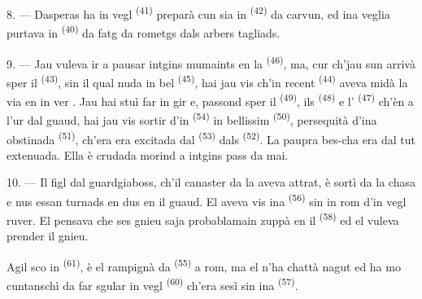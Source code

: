 8. --- Dasperas ha in vegl  \textsuperscript{(41)} preparà cun sia
 in  \textsuperscript{(42)} da carvun, ed ina veglia purtava
in  \textsuperscript{(40)} da  fatg da rometgs dals arbers
tagliads.

\VUsaut{3.0mm}
\VUsaut{3.0mm}

9. --- Jau vuleva ir a pausar intgins mumaints en la 
\textsuperscript{(46)}, ma, cur ch'jau sun arrivà sper il 
\textsuperscript{(43)}, sin il qual nuda in bel  \textsuperscript{(45)},
hai jau vis ch'in recent  \textsuperscript{(44)} aveva midà la via en in ver
. Jau hai stuì far in gir e, passond sper il 
\textsuperscript{(49)}, ils  \textsuperscript{(48)} e l'
\textsuperscript{(47)} ch'èn a l'ur dal guaud, hai jau vis sortir d'in 
\textsuperscript{(54)} in bellissim  \textsuperscript{(50)}, persequità
d'ina obstinada  \textsuperscript{(51)}, ch'era era excitada dal
 \textsuperscript{(53)} dals 
\textsuperscript{(52)}. La paupra bes-cha era dal tut extenuada. Ella è crudada
morind a intgins pass da mai.

10. --- Il figl dal guardgiaboss, ch'il canaster da la 
aveva attrat, è sortì da la chasa e nus essan turnads en dus en il guaud. El aveva
vis ina  \textsuperscript{(56)} sin in rom d'in vegl ruver. El pensava che
ses gnieu saja probablamain zuppà en il  \textsuperscript{(58)} ed el
vuleva prender il gnieu.

Agil sco in  \textsuperscript{(61)}, è el rampignà da 
\textsuperscript{(55)} a rom, ma el n'ha chattà nagut ed ha mo cuntanschì da far sgular
in vegl  \textsuperscript{(60)} ch'era sesì sin ina 
\textsuperscript{(57)}.

\VUsaut{4.0mm}
\VUfilet{22mm}
